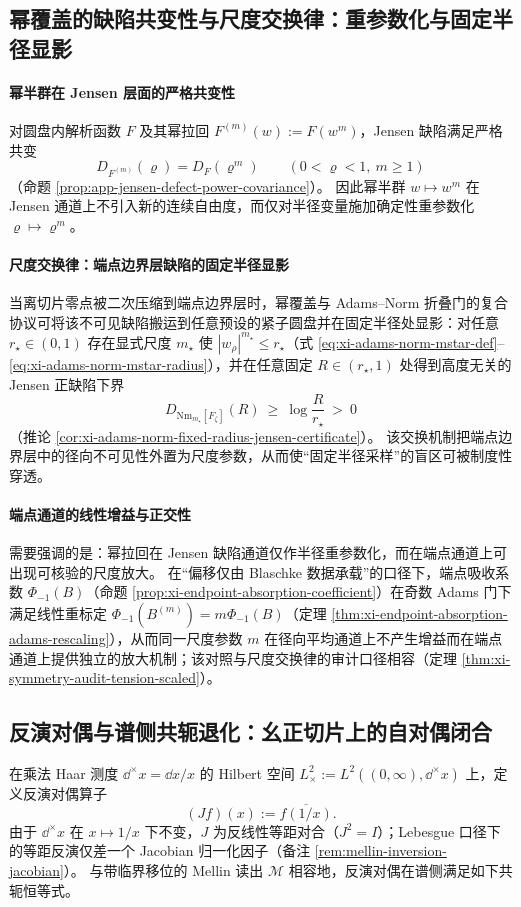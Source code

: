 \subsection{幂覆盖的缺陷共变性与尺度交换律：重参数化与固定半径显影}\label{subsec:cdim-power-cover-scale-exchange}
\paragraph{幂半群在 Jensen 层面的严格共变性}
对圆盘内解析函数 \(F\) 及其幂拉回 \(F^{(m)}(w):=F(w^m)\)，Jensen 缺陷满足严格共变
\[
D_{F^{(m)}}(\varrho)=D_F(\varrho^m)
\qquad(0<\varrho<1,\ m\ge 1)
\]
（命题 \ref{prop:app-jensen-defect-power-covariance}）。
因此幂半群 \(w\mapsto w^m\) 在 Jensen 通道上不引入新的连续自由度，而仅对半径变量施加确定性重参数化 \(\varrho\mapsto \varrho^m\)。

\paragraph{尺度交换律：端点边界层缺陷的固定半径显影}
当离切片零点被二次压缩到端点边界层时，幂覆盖与 Adams--Norm 折叠门的复合协议可将该不可见缺陷搬运到任意预设的紧子圆盘并在固定半径处显影：对任意 \(r_\star\in(0,1)\) 存在显式尺度 \(m_\star\) 使 \(|w_\rho|^{m_\star}\le r_\star\)（式 \eqref{eq:xi-adams-norm-mstar-def}--\eqref{eq:xi-adams-norm-mstar-radius}），并在任意固定 \(R\in(r_\star,1)\) 处得到高度无关的 Jensen 正缺陷下界
\[
D_{\mathrm{Nm}_{m_\star}[F_\zeta]}(R)\ \ge\ \log\!\frac{R}{r_\star}\ >\ 0
\]
（推论 \ref{cor:xi-adams-norm-fixed-radius-jensen-certificate}）。
该交换机制把端点边界层中的径向不可见性外置为尺度参数，从而使“固定半径采样”的盲区可被制度性穿透。

\paragraph{端点通道的线性增益与正交性}
需要强调的是：幂拉回在 Jensen 缺陷通道仅作半径重参数化，而在端点通道上可出现可核验的尺度放大。
在“偏移仅由 Blaschke 数据承载”的口径下，端点吸收系数 \(\Phi_{-1}(B)\)（命题 \ref{prop:xi-endpoint-absorption-coefficient}）在奇数 Adams 门下满足线性重标定 \(\Phi_{-1}(B^{(m)})=m\Phi_{-1}(B)\)（定理 \ref{thm:xi-endpoint-absorption-adams-rescaling}），从而同一尺度参数 \(m\) 在径向平均通道上不产生增益而在端点通道上提供独立的放大机制；该对照与尺度交换律的审计口径相容（定理 \ref{thm:xi-symmetry-audit-tension-scaled}）。

\subsection{反演对偶与谱侧共轭退化：幺正切片上的自对偶闭合}\label{subsec:cdim-inversion-duality-spectral-conjugation}
在乘法 Haar 测度 \(\dd^{\times}x=\dd x/x\) 的 Hilbert 空间 \(L^{2}_{\times}:=L^{2}((0,\infty),\dd^{\times}x)\) 上，定义反演对偶算子
\[
(Jf)(x):=\overline{f(1/x)}.
\]
由于 \(\dd^{\times}x\) 在 \(x\mapsto 1/x\) 下不变，\(J\) 为反线性等距对合（\(J^{2}=I\)）；Lebesgue 口径下的等距反演仅差一个 Jacobian 归一化因子（备注 \ref{rem:mellin-inversion-jacobian}）。
与带临界移位的 Mellin 读出 \(\mathcal{M}\) 相容地，反演对偶在谱侧满足如下共轭恒等式。

